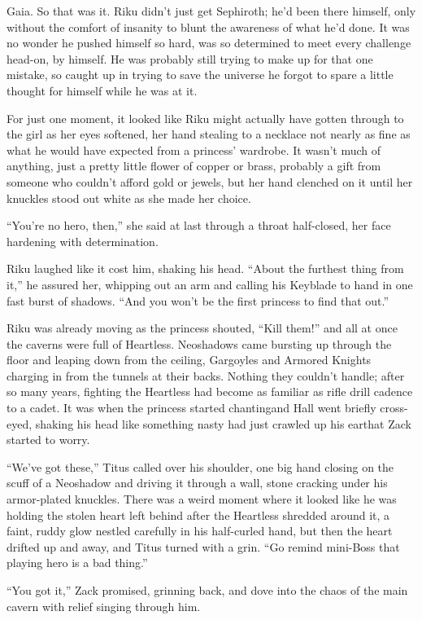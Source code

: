 Gaia. So that was it. Riku didn't just get Sephiroth; he'd been there himself, only without the comfort of insanity to blunt the awareness of what he'd done. It was no wonder he pushed himself so hard, was so determined to meet every challenge head-on, by himself. He was probably still trying to make up for that one mistake, so caught up in trying to save the universe he forgot to spare a little thought for himself while he was at it.

For just one moment, it looked like Riku might actually have gotten through to the girl as her eyes softened, her hand stealing to a necklace not nearly as fine as what he would have expected from a princess' wardrobe. It wasn't much of anything, just a pretty little flower of copper or brass, probably a gift from someone who couldn't afford gold or jewels, but her hand clenched on it until her knuckles stood out white as she made her choice.

``You're no hero, then,'' she said at last through a throat half-closed, her face hardening with determination.

Riku laughed like it cost him, shaking his head. ``About the furthest thing from it,'' he assured her, whipping out an arm and calling his Keyblade to hand in one fast burst of shadows. ``And you won't be the first princess to find that out.''

Riku was already moving as the princess shouted, ``Kill them!'' and all at once the caverns were full of Heartless. Neoshadows came bursting up through the floor and leaping down from the ceiling, Gargoyles and Armored Knights charging in from the tunnels at their backs. Nothing they couldn't handle; after so many years, fighting the Heartless had become as familiar as rifle drill cadence to a cadet. It was when the princess started chanting\textemdash and Hall went briefly cross-eyed, shaking his head like something nasty had just crawled up his ear\textemdash that Zack started to worry.

``We've got these,'' Titus called over his shoulder, one big hand closing on the scuff of a Neoshadow and driving it through a wall, stone cracking under his armor-plated knuckles. There was a weird moment where it looked like he was holding the stolen heart left behind after the Heartless shredded around it, a faint, ruddy glow nestled carefully in his half-curled hand, but then the heart drifted up and away, and Titus turned with a grin. ``Go remind mini-Boss that playing hero is a bad thing.''

``You got it,'' Zack promised, grinning back, and dove into the chaos of the main cavern with relief singing through him.

